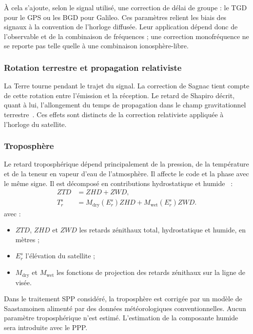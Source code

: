 À cela s'ajoute, selon le signal utilisé, une correction de délai de groupe :
le TGD pour le GPS ou les BGD pour Galileo. Ces paramètres relient les biais
des signaux à la convention de l'horloge diffusée. Leur application dépend
donc de l'observable et de la combinaison de fréquences ; une correction
monofréquence ne se reporte pas telle quelle à une combinaison ionosphère-libre.

\subsubsection{Rotation terrestre et propagation relativiste}

La Terre tourne pendant le trajet du signal. La correction de Sagnac tient
compte de cette rotation entre l'émission et la réception. Le retard de
Shapiro décrit, quant à lui, l'allongement du temps de propagation dans le
champ gravitationnel terrestre~\cite{ashby2003}. Ces effets sont distincts de
la correction relativiste appliquée à l'horloge du satellite.

\subsubsection{Troposphère}

Le retard troposphérique dépend principalement de la pression, de la
température et de la teneur en vapeur d'eau de l'atmosphère. Il affecte le
code et la phase avec le même signe. Il est décomposé en contributions
hydrostatique et humide~\cite{saastamoinen1972} :
\begin{align}
ZTD&=ZHD+ZWD,\\
T_r^s&=M_{\mathrm{dry}}(E_r^s)ZHD+
M_{\mathrm{wet}}(E_r^s)ZWD.
\label{new:tropo}
\end{align}
avec :
\begin{itemize}
\item $ZTD$, $ZHD$ et $ZWD$ les retards zénithaux total, hydrostatique et humide,
en mètres ;
\item $E_r^s$ l'élévation du satellite ;
\item $M_{\mathrm{dry}}$ et $M_{\mathrm{wet}}$ les fonctions de projection
des retards zénithaux sur la ligne de visée.
\end{itemize}

Dans le traitement SPP considéré, la troposphère est corrigée par un modèle
de Saastamoinen alimenté par des données météorologiques conventionnelles.
Aucun paramètre troposphérique n'est estimé. L'estimation de la composante
humide sera introduite avec le PPP.

